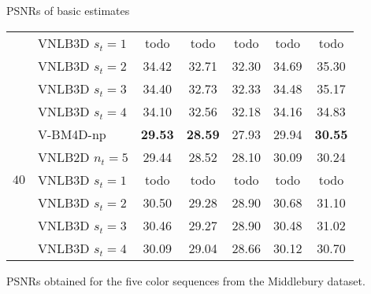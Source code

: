 \documentclass[mathserif, 8pt]{beamer}
\newcommand{\best}[1]{\textbf{\textcolor{MyOrange}{#1}}}
\begin{document}
\begin{frame}{PSNRs of basic estimates}
\begin{center}
{\begin{tabular}{ c | l |c c c c c}
		                      & VNLB3D $s_t = 1$ &       todo   &       todo   &       todo   &       todo   &       todo   \\
		                      & VNLB3D $s_t = 2$ &       34.42  &       32.71  &       32.30  &       34.69  &       35.30  \\
		                      & VNLB3D $s_t = 3$ &       34.40  &       32.73  &       32.33  &       34.48  &       35.17  \\
		                      & VNLB3D $s_t = 4$ &       34.10  &       32.56  &       32.18  &       34.16  &       34.83  \\\hline
%
		\multirow{5}{*}{$40$} & V-BM4D-np        & \best{29.53} & \best{28.59} &       27.93  &       29.94  & \best{30.55} \\%
		                      & VNLB2D $n_t = 5$ &       29.44  &       28.52  &       28.10  &       30.09  &       30.24  \\
		                      & VNLB3D $s_t = 1$ &       todo   &       todo   &       todo   &       todo   &       todo   \\
		                      & VNLB3D $s_t = 2$ &       30.50  &       29.28  &       28.90  &       30.68  &       31.10  \\
		                      & VNLB3D $s_t = 3$ &       30.46  &       29.27  &       28.90  &       30.48  &       31.02  \\
		                      & VNLB3D $s_t = 4$ &       30.09  &       29.04  &       28.66  &       30.12  &       30.70  \\\hline
		\end{tabular}}

	\bigskip

	PSNRs obtained for the five color sequences from the Middlebury dataset.

	\end{center}


\end{frame}
\end{document}
